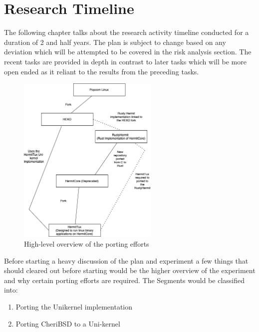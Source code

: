 


\chapter{Research Timeline}  %

\ifpdf
    \graphicspath{{ResearchTimeline/Figs/Raster/}{ResearchTimeline/Figs/PDF/}{ResearchTimeline/Figs/}}
\else
    \graphicspath{{ResearchTimeline/Figs/}{ResearchTimeline/Figs/}}
\fi

The following chapter talks about the research activity timeline conducted for a duration of 2 and half years. 
The plan is subject to change based on any deviation which will be attempted to be covered in the risk analysis 
section. The recent tasks are provided in depth in contrast to later tasks which will be more open ended 
as it reliant to the results from the preceding tasks. 

\begin{figure}[htbp!] 
  \centering    
  \includegraphics[width=0.6\textwidth]{PlannerActivity}
  \caption[Planner]{High-level overview of the porting efforts}
  \label{fig:PlannerPorting}
  \end{figure}

Before starting a heavy discussion of the plan and experiment a few things that should cleared out before starting would be 
the higher overview of the experiment and why certain porting efforts are required. The Segments would be classified into: 
\begin{enumerate}
  \item Porting the Unikernel implementation 
  \item Porting CheriBSD to a Uni-kernel
\end{enumerate}

